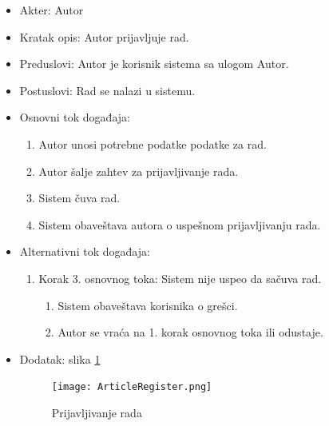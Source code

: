 \documentclass[a4paper]{article}
\begin{document}
\begin{itemize}
    \item Akter: Autor
    \item Kratak opis: Autor prijavljuje rad.
    \item Preduslovi: Autor je korisnik sistema sa ulogom Autor.
    \item Postuslovi: Rad se nalazi u sistemu.
    \item Osnovni tok događaja:
        \begin{enumerate}
            \item Autor unosi potrebne podatke podatke za rad.
            \item Autor šalje zahtev za prijavljivanje rada.
            \item Sistem čuva rad.
            \item Sistem obaveštava autora o uspešnom prijavljivanju rada.
        \end{enumerate}
    \item Alternativni tok događaja:
        \begin{enumerate}
            \item Korak 3. osnovnog toka: Sistem nije uspeo da sačuva rad.
            \begin{enumerate}
                \item Sistem obaveštava korisnika o grešci.
                \item Autor se vraća na 1. korak osnovnog toka ili odustaje.
            \end{enumerate}
        \end{enumerate}
    \item Dodatak: slika \ref{fig:prijavljivanje}
    \begin{figure}[hbt!]
    \centering
    \texttt{[image: ArticleRegister.png]}
    \caption{Prijavljivanje rada}
    \label{fig:prijavljivanje}
\end{figure}
\end{itemize}

\newpage
\end{document}
